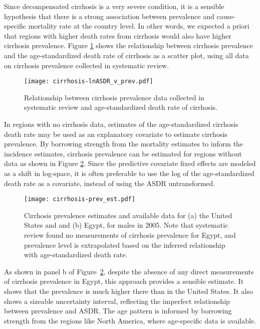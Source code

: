 Since decompensated cirrhosis is a very severe condition, it is a
sensible hypothesis that there is a strong association between
prevalence and cause-specific mortality rate at the country level.  In
other words, we expected a priori that regions with higher death rates
from cirrhosis would also have higher cirrhosis prevalence.  Figure
\ref{fig:app-cirrhosis asp} shows the relationship between cirrhosis
prevalence and the age-standardized death rate of cirrhosis as a
scatter plot, using all data on cirrhosis prevalence collected in
systematic review.

    \begin{figure}[h]
        \begin{center}
            \texttt{[image: cirrhosis-lnASDR\_v\_prev.pdf]}
            \caption{Relationship between cirrhosis prevalence data
              collected in systematic review and age-standardized
              death rate of cirrhosis.}
            \label{fig:app-cirrhosis asp}
        \end{center}
    \end{figure}

In regions with no cirrhosis data, estimates of the age-standardized
cirrhosis death rate may be used as an explanatory covariate to
estimate cirrhosis prevalence.  By borrowing strength from the
mortality estimates to inform the incidence estimates, cirrhosis
prevalence can be estimated for regions without data as shown in
Figure \ref{fig:app-cirrhosis prev est}.  Since the predictive
covariate fixed effects are modeled as a shift in log-space, it is
often preferable to use the log of the age-standardized death rate as
a covariate, instead of using the ASDR untransformed.

    \begin{figure}[h]
        \begin{center}
            \texttt{[image: cirrhosis-prev\_est.pdf]}
            \caption{Cirrhosis prevalence estimates and available data
              for (a) the United States and and (b) Egypt, for males
              in 2005. Note that systematic review found no
              measurements of cirrhosis prevalence for Egypt, and
              prevalence level is extrapolated based on the inferred
              relationship with age-standardized death rate.}
            \label{fig:app-cirrhosis prev est}
        \end{center}
    \end{figure}

As shown in panel b of Figure~\ref{fig:app-cirrhosis prev est},
despite the absence of any direct measurements of cirrhosis prevalence
in Egypt, this approach provides a sensible estimate.  It shows that
the prevalence is much higher there than in the United States.  It
also shows a sizeable uncertainty interval, reflecting the imperfect
relationship between prevalence and ASDR.  The age pattern is informed
by borrowing strength from the regions like North America, where
age-specific data is available.
